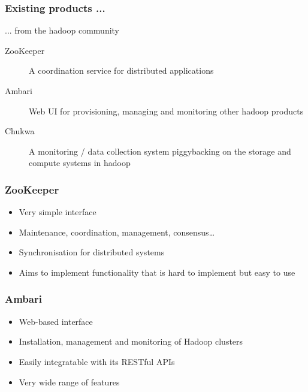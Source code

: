 \documentclass{beamer}
\begin{document}
\begin{frame}
  \frametitle{Existing products ...}

  ... from the hadoop community

  \begin{description}
    \item[ZooKeeper] A coordination service for distributed applications
    \item[Ambari] Web UI for provisioning, managing and monitoring other hadoop products
    \item[Chukwa] A monitoring / data collection system piggybacking on the storage and compute systems in hadoop
  \end{description}

\end{frame}

\begin{frame}
  \frametitle{ZooKeeper}


  \begin{itemize}
    \item Very simple interface
    \item Maintenance, coordination, management, consensus\dots
    \item Synchronisation for distributed systems
    \item Aims to implement functionality that is hard to implement but easy to use
  \end{itemize}

\end{frame}

\begin{frame}
  \frametitle{Ambari}


  \begin{itemize}
    \item Web-based interface
    \item Installation, management and monitoring of Hadoop clusters
    \item Easily integratable with its RESTful APIs
    \item Very wide range of features
  \end{itemize}

\end{frame}
\end{document}
